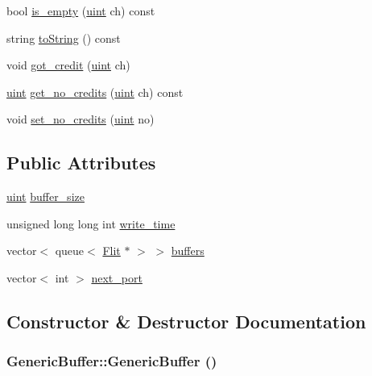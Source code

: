 \begin{CompactItemize}
\item 
bool \hyperlink{classGenericBuffer_94742936925e0b4873dd270aed2c326d}{is\_\-empty} (\hyperlink{outputBuffer_8h_91ad9478d81a7aaf2593e8d9c3d06a14}{uint} ch) const 
\item 
string \hyperlink{classGenericBuffer_3e9808bf28490fcc38ba13e7eb6ef501}{toString} () const 
\item 
void \hyperlink{classGenericBuffer_61f0e9249ca38d149372bdd74906f2a7}{got\_\-credit} (\hyperlink{outputBuffer_8h_91ad9478d81a7aaf2593e8d9c3d06a14}{uint} ch)
\item 
\hyperlink{outputBuffer_8h_91ad9478d81a7aaf2593e8d9c3d06a14}{uint} \hyperlink{classGenericBuffer_8c80e28741bae248ed61c72cc5399f2d}{get\_\-no\_\-credits} (\hyperlink{outputBuffer_8h_91ad9478d81a7aaf2593e8d9c3d06a14}{uint} ch) const 
\item 
void \hyperlink{classGenericBuffer_222b1ccd9db0a123acb9f3d34d38881c}{set\_\-no\_\-credits} (\hyperlink{outputBuffer_8h_91ad9478d81a7aaf2593e8d9c3d06a14}{uint} no)
\end{CompactItemize}
\subsection*{Public Attributes}
\begin{CompactItemize}
\item 
\hyperlink{outputBuffer_8h_91ad9478d81a7aaf2593e8d9c3d06a14}{uint} \hyperlink{classGenericBuffer_67f0637384d4ec2866b3d93e773c7527}{buffer\_\-size}
\item 
unsigned long long int \hyperlink{classGenericBuffer_5cc12d1bdf25617d368714cdfd4134d5}{write\_\-time}
\item 
vector$<$ queue$<$ \hyperlink{classFlit}{Flit} $\ast$ $>$ $>$ \hyperlink{classGenericBuffer_827e77b8ad0d8fcd36c95e63b6ed8001}{buffers}
\item 
vector$<$ int $>$ \hyperlink{classGenericBuffer_10b8e8d2522ed4797fa485d6ffa41838}{next\_\-port}
\end{CompactItemize}


\subsection{Constructor \& Destructor Documentation}
\hypertarget{classGenericBuffer_4281e7a40133d057f6cfad3b715084b0}{
\subsubsection[{GenericBuffer}]{\setlength{\rightskip}{0pt plus 5cm}GenericBuffer::GenericBuffer ()}}
\label{classGenericBuffer_4281e7a40133d057f6cfad3b715084b0}


